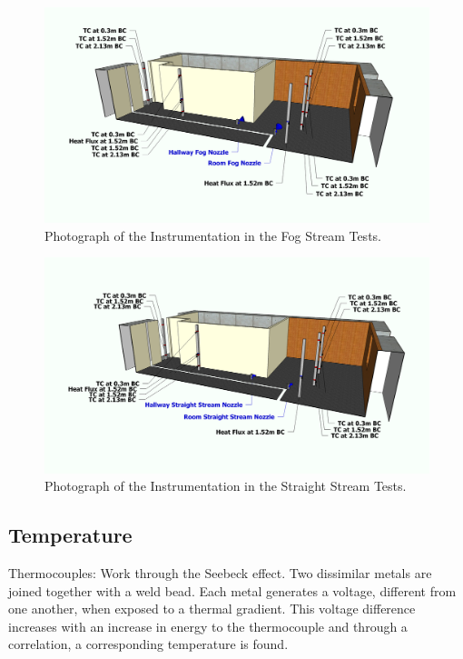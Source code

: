 \documentclass[12pt,oneside]{book}
\begin{document}
\begin{figure}[!ht]
	\includegraphics[width=6in]{../Figures/Pictures/Fog_Instrumentation}
	\caption{Photograph of the Instrumentation in the Fog Stream Tests.}
	\label{fig:Fog_Instrumentation}
\end{figure}

\begin{figure}[!ht]
	\includegraphics[width=6in]{../Figures/Pictures/Straight_Stream_Instrumentation}
	\caption{Photograph of the Instrumentation in the Straight Stream Tests.}
	\label{fig:Straigh_Stream_Instrumentation}
\end{figure}

\subsection{Temperature}
\label{subsec:Temperature}

Thermocouples:
Work through the Seebeck effect.  Two dissimilar metals are joined together with a weld bead.  Each metal generates a voltage, different from one another, when exposed to a thermal gradient.  This voltage difference increases with an increase in energy to the thermocouple and through a correlation, a corresponding temperature is found.  
\end{document}
